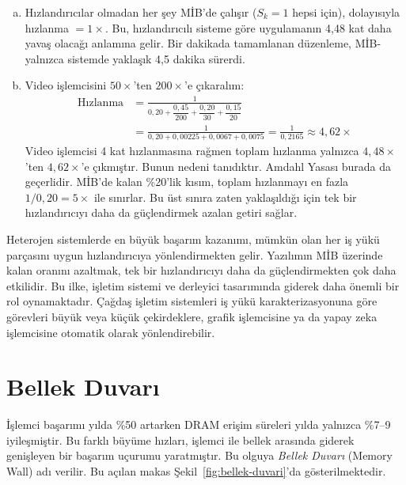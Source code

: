 \begin{ornek}[2.12]
\begin{enumerate}[(a)]
    \item Hızlandırıcılar olmadan her şey MİB'de çalışır ($S_k = 1$ hepsi için), dolayısıyla hızlanma $= 1\times$. Bu, hızlandırıcılı sisteme göre uygulamanın 4,48 kat daha yavaş olacağı anlamına gelir. Bir dakikada tamamlanan düzenleme, MİB-yalnızca sistemde yaklaşık 4,5 dakika sürerdi.

    \item Video işlemcisini $50\times$'ten $200\times$'e çıkaralım:
    \begin{align*}
    \text{Hızlanma} &= \frac{1}{0{,}20 + \dfrac{0{,}45}{200} + \dfrac{0{,}20}{30} + \dfrac{0{,}15}{20}} \\[6pt]
    &= \frac{1}{0{,}20 + 0{,}00225 + 0{,}0067 + 0{,}0075}
    = \frac{1}{0{,}2165}
    \approx 4{,}62\times
    \end{align*}
    Video işlemcisi 4 kat hızlanmasına rağmen toplam hızlanma yalnızca $4{,}48\times$'ten $4{,}62\times$'e çıkmıştır. Bunun nedeni tanıdıktır. Amdahl Yasası burada da geçerlidir. MİB'de kalan \%20'lik kısım, toplam hızlanmayı en fazla $1/0{,}20 = 5\times$ ile sınırlar. Bu üst sınıra zaten yaklaşıldığı için tek bir hızlandırıcıyı daha da güçlendirmek azalan getiri sağlar.
\end{enumerate}
\end{ornek}

\begin{bilginot}
Heterojen sistemlerde en büyük başarım kazanımı, mümkün olan her iş yükü parçasını uygun hızlandırıcıya yönlendirmekten gelir. Yazılımın MİB üzerinde kalan oranını azaltmak, tek bir hızlandırıcıyı daha da güçlendirmekten çok daha etkilidir. Bu ilke, işletim sistemi ve derleyici tasarımında giderek daha önemli bir rol oynamaktadır. Çağdaş işletim sistemleri iş yükü karakterizasyonuna göre görevleri büyük veya küçük çekirdeklere, grafik işlemcisine ya da yapay zeka işlemcisine otomatik olarak yönlendirebilir.
\end{bilginot}


\section{Bellek Duvarı}
\label{sec:bellek-duvari}

İşlemci başarımı yılda \%50 artarken DRAM erişim süreleri yılda yalnızca \%7--9 iyileşmiştir. Bu farklı büyüme hızları, işlemci ile bellek arasında giderek genişleyen bir başarım uçurumu yaratmıştır. Bu olguya \emph{Bellek Duvarı} (Memory Wall) adı verilir. Bu açılan makas Şekil~\ref{fig:bellek-duvari}'da gösterilmektedir.

